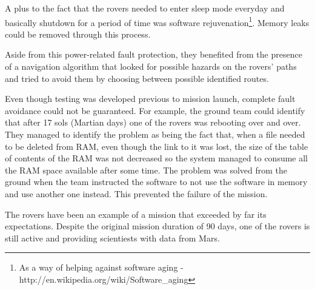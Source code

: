 A plus to the fact that the rovers needed to enter sleep mode everyday and
basically shutdown for a period of time was software rejuvenation\footnote{As a
way of helping against software aging -
http://en.wikipedia.org/wiki/Software\_aging}. Memory leaks could be removed
through this process.

Aside from this power-related fault protection, they benefited from the presence
of a navigation algorithm that looked for possible hazards on the rovers' paths
and tried to avoid them by choosing between possible identified routes.

Even though testing was developed previous to mission launch, complete fault
avoidance could not be guaranteed. For example, the ground team could identify
that after 17 sols (Martian days) one of the rovers was rebooting over and over.
They managed to identify the problem as being the fact that, when a file needed
to be deleted from RAM, even though the link to it was lost, the size of the
table of contents of the RAM was not decreased so the system managed to consume
all the RAM space available after some time. The problem was solved from the
ground when the team instructed the software to not use the software in memory
and use another one instead. This prevented the failure of the mission.

The rovers have been an example of a mission that exceeded by far its
expectations. Despite the original mission duration of 90 days, one of the
rovers is still active and providing scientiests with data from Mars.
